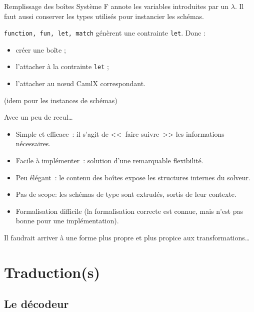 \documentclass[final]{beamer}
\begin{document}
\begin{frame}{Remplissage des boîtes}
  Système F annote les variables introduites par un $\lambda$. Il faut aussi
  conserver les types utilisés pour instancier les schémas.

  \begin{center}
  \end{center}

  \texttt{function, fun, let, match} génèrent une contrainte \texttt{let}. Donc :
  \begin{itemize}
    \item créer une boîte ;
    \item l'attacher à la contrainte \texttt{let} ;
    \item l'attacher au nœud CamlX correspondant.
  \end{itemize}

  \begin{flushright}
    (idem pour les instances de schémas)
  \end{flushright}
\end{frame}

\begin{frame}{Avec un peu de recul…}
  \begin{itemize}
    \item Simple et efficace~: il s'agit de <<~faire suivre~>> les informations
      nécessaires.
    \item Facile à implémenter~: solution d'une remarquable flexibilité.
    \item Peu élégant~: le contenu des boîtes expose les structures internes du
      solveur.
    \item Pas de scope: les schémas de type sont extrudés, sortis de leur
      contexte.
    \item Formalisation difficile (la formalisation correcte est connue, mais
      n'est pas bonne pour une implémentation).
  \end{itemize}
  Il faudrait arriver à une forme plus propre et plus propice aux
  transformations…
\end{frame}

\section{Traduction(s)}

\subsection{Le décodeur}
\end{document}
